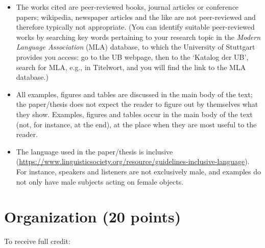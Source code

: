 \documentclass[11pt,fleqn,a4paper/thesis]{article}
\newcommand{\6}{\mbox{$[\hspace*{-.6mm}[$}}
\newcommand{\9}{\mbox{$]\hspace*{-.6mm}]$}}
\begin{document}
\begin{itemize}[itemsep=-1pt,leftmargin=2.5ex,topsep=-2pt]
\item The works cited are peer-reviewed books, journal articles or conference papers; wikipedia, newspaper articles and the like are not peer-reviewed and therefore typically not appropriate. (You can identify suitable peer-reviewed works by searching key words pertaining to your research topic in the {\em Modern Language Association} (MLA) database, to which the University of Stuttgart provides you access: go to the UB webpage, then to the `Katalog  der UB', search for MLA, e.g., in Titelwort, and you will find the link to the MLA database.)

\item All examples, figures and tables are discussed in the main body of the text; the paper/thesis does not expect the reader to figure out by themselves what they show. Examples, figures and tables occur in the main body of the text (not, for instance, at the end), at the place when they are most useful to the reader.

\item The language used in the paper/thesis is inclusive (\url{https://www.linguisticsociety.org/resource/guidelines-inclusive-language}). For instance, speakers and listeners are not exclusively male, and examples do not only have male subjects acting on female objects.

\end{itemize}

\section{Organization (20 points)}

To receive full credit:
\end{document}
